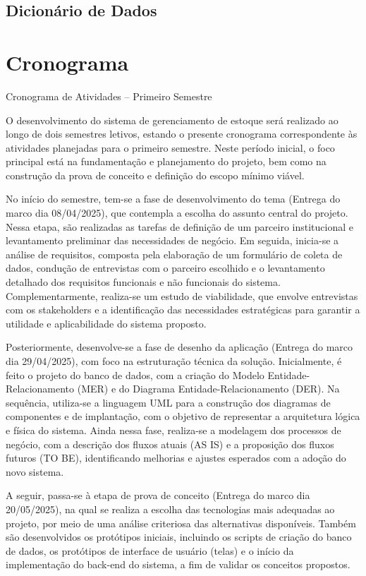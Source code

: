 \documentclass[
	12pt,				%
	openright,			%
	twoside,			%
	a4paper,			%
	english,			%
	french,				%
	spanish,			%
	brazil				%
	]{abntex2}
\begin{document}
\subsection{Dicionário de Dados}

\section{Cronograma}

Cronograma de Atividades – Primeiro Semestre

O desenvolvimento do sistema de gerenciamento de estoque será realizado ao longo de dois semestres letivos, estando o presente cronograma correspondente às atividades planejadas para o primeiro semestre. Neste período inicial, o foco principal está na fundamentação e planejamento do projeto, bem como na construção da prova de conceito e definição do escopo mínimo viável.

No início do semestre, tem-se a fase de desenvolvimento do tema (Entrega do marco dia 08/04/2025), que contempla a escolha do assunto central do projeto. Nessa etapa, são realizadas as tarefas de definição de um parceiro institucional e levantamento preliminar das necessidades de negócio. Em seguida, inicia-se a análise de requisitos, composta pela elaboração de um formulário de coleta de dados, condução de entrevistas com o parceiro escolhido e o levantamento detalhado dos requisitos funcionais e não funcionais do sistema. Complementarmente, realiza-se um estudo de viabilidade, que envolve entrevistas com os stakeholders e a identificação das necessidades estratégicas para garantir a utilidade e aplicabilidade do sistema proposto.

Posteriormente, desenvolve-se a fase de desenho da aplicação (Entrega do marco dia 29/04/2025), com foco na estruturação técnica da solução. Inicialmente, é feito o projeto do banco de dados, com a criação do Modelo Entidade-Relacionamento (MER) e do Diagrama Entidade-Relacionamento (DER). Na sequência, utiliza-se a linguagem UML para a construção dos diagramas de componentes e de implantação, com o objetivo de representar a arquitetura lógica e física do sistema. Ainda nessa fase, realiza-se a modelagem dos processos de negócio, com a descrição dos fluxos atuais (AS IS) e a proposição dos fluxos futuros (TO BE), identificando melhorias e ajustes esperados com a adoção do novo sistema.

A seguir, passa-se à etapa de prova de conceito (Entrega do marco dia 20/05/2025), na qual se realiza a escolha das tecnologias mais adequadas ao projeto, por meio de uma análise criteriosa das alternativas disponíveis. Também são desenvolvidos os protótipos iniciais, incluindo os scripts de criação do banco de dados, os protótipos de interface de usuário (telas) e o início da implementação do back-end do sistema, a fim de validar os conceitos propostos.
\end{document}

